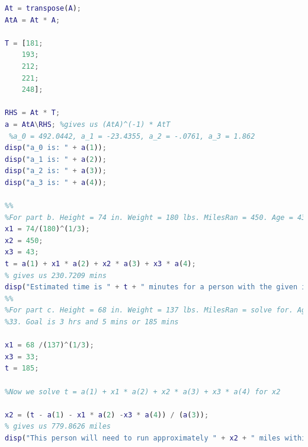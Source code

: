 \documentclass[answers,10pt]{exam}
\begin{document}
\begin{questions}
\begin{solution}
\begin{lstlisting}[language = Matlab]
At = transpose(A);
AtA = At * A;

T = [181;
    193;
    212;
    221;
    248];

RHS = At * T;
a = AtA\RHS; %gives us (AtA)^(-1) * AtT
 %a_0 = 492.0442, a_1 = -23.4355, a_2 = -.0761, a_3 = 1.862
disp("a_0 is: " + a(1));
disp("a_1 is: " + a(2));
disp("a_2 is: " + a(3));
disp("a_3 is: " + a(4));

%% 
%For part b. Height = 74 in. Weight = 180 lbs. MilesRan = 450. Age = 43
x1 = 74/(180)^(1/3);
x2 = 450;
x3 = 43;
t = a(1) + x1 * a(2) + x2 * a(3) + x3 * a(4);
% gives us 230.7209 mins
disp("Estimated time is " + t + " minutes for a person with the given information")
%%
%For part c. Height = 68 in. Weight = 137 lbs. MilesRan = solve for. Age =
%33. Goal is 3 hrs and 5 mins or 185 mins

x1 = 68 /(137)^(1/3);
x3 = 33;
t = 185;

%Now we solve t = a(1) + x1 * a(2) + x2 * a(3) + x3 * a(4) for x2

x2 = (t - a(1) - x1 * a(2) -x3 * a(4)) / (a(3));
% gives us 779.8626 miles
disp("This person will need to run approximately " + x2 + " miles within 8 weeks of the marathon"); 



\end{lstlisting}
\end{solution}
\end{questions}
\end{document}
